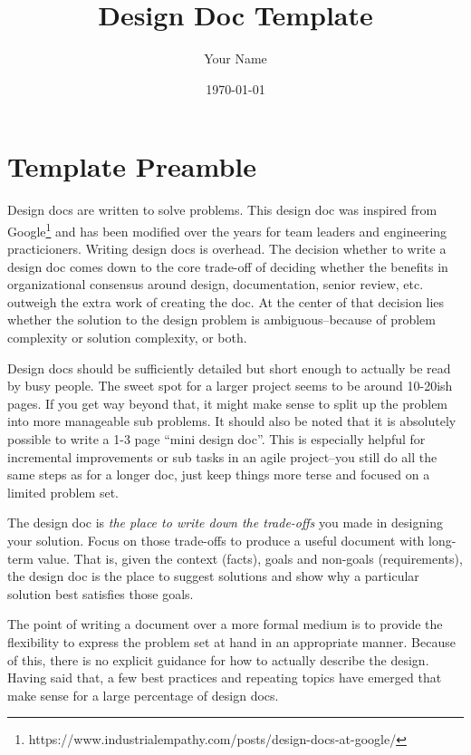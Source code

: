 \documentclass{article}
\title{Design Doc Template}
\author{Your Name}
\date{\today} %
\begin{document}
\maketitle %

\tableofcontents
\pagebreak

\section{Template Preamble}

Design docs are written to solve problems. This design doc was inspired from Google\footnote[1]{https://www.industrialempathy.com/posts/design-docs-at-google/} and has been modified over the years for team leaders and engineering practicioners. Writing design docs is overhead. The decision whether to write a design doc comes down to the core trade-off of deciding whether the benefits in organizational consensus around design, documentation, senior review, etc. outweigh the extra work of creating the doc. At the center of that decision lies whether the solution to the design problem is ambiguous–because of problem complexity or solution complexity, or both.

Design docs should be sufficiently detailed but short enough to actually be read by busy people. The sweet spot for a larger project seems to be around 10-20ish pages. If you get way beyond that, it might make sense to split up the problem into more manageable sub problems. It should also be noted that it is absolutely possible to write a 1-3 page “mini design doc”. This is especially helpful for incremental improvements or sub tasks in an agile project–you still do all the same steps as for a longer doc, just keep things more terse and focused on a limited problem set.

The design doc is \textit{the place to write down the trade-offs} you made in designing your solution. Focus on those trade-offs to produce a useful document with long-term value. That is, given the context (facts), goals and non-goals (requirements), the design doc is the place to suggest solutions and show why a particular solution best satisfies those goals.

The point of writing a document over a more formal medium is to provide the flexibility to express the problem set at hand in an appropriate manner. Because of this, there is no explicit guidance for how to actually describe the design. Having said that, a few best practices and repeating topics have emerged that make sense for a large percentage of design docs.
\end{document}
